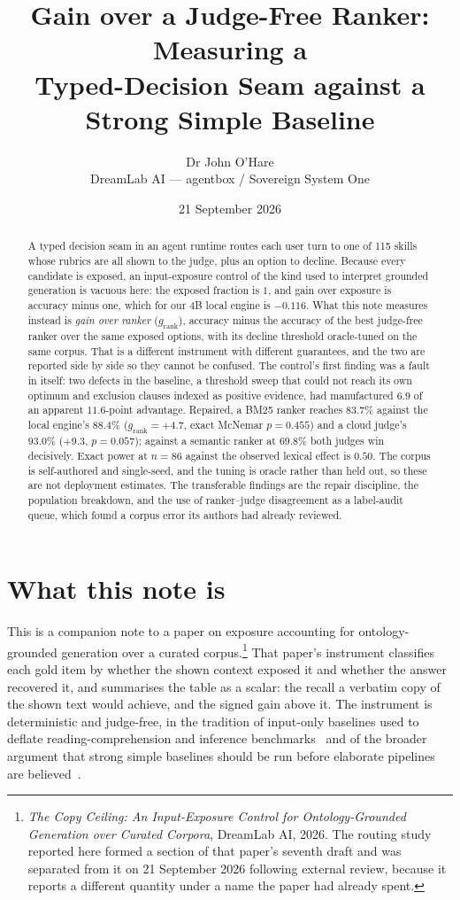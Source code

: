 \documentclass[10pt,twocolumn]{article}
\title{\vspace{-1.2cm}\bfseries Gain over a Judge-Free Ranker: Measuring a\\
Typed-Decision Seam against a Strong Simple Baseline}
\author{Dr John O'Hare\\ \small DreamLab AI --- agentbox / Sovereign System One}
\date{21 September 2026}
\newcommand{\grank}{$g_{\mathrm{rank}}$}
\begin{document}
\maketitle

\begin{abstract}
\noindent
A typed decision seam in an agent runtime routes each user turn to one of 115 skills whose
rubrics are all shown to the judge, plus an option to decline. Because every candidate is
exposed, an input-exposure control of the kind used to interpret grounded generation is
vacuous here: the exposed fraction is $1$, and gain over exposure is accuracy minus one,
which for our 4B local engine is $-0.116$. What this note measures instead is
\emph{gain over ranker} (\grank), accuracy minus the accuracy of the best judge-free
ranker over the same exposed options, with its decline threshold oracle-tuned on the same
corpus. That is a different instrument with different guarantees, and the two are reported
side by side so they cannot be confused. The control's first finding was a fault in itself:
two defects in the baseline, a threshold sweep that could not reach its own optimum and
exclusion clauses indexed as positive evidence, had manufactured $6.9$ of an apparent
$11.6$-point advantage. Repaired, a BM25 ranker reaches $83.7\%$ against the local engine's
$88.4\%$ (\grank${}=+4.7$, exact McNemar $p=0.455$) and a cloud judge's $93.0\%$
(${+}9.3$, $p=0.057$); against a semantic ranker at $69.8\%$ both judges win decisively.
Exact power at $n=86$ against the observed lexical effect is $0.50$. The corpus is self-authored
and single-seed, and the tuning is oracle rather than held out, so these are not deployment
estimates. The transferable findings are the repair discipline, the population breakdown,
and the use of ranker--judge disagreement as a label-audit queue, which found a corpus
error its authors had already reviewed.
\end{abstract}

\section{What this note is}\label{sec:what}
This is a companion note to a paper on exposure accounting for ontology-grounded
generation over a curated corpus.\footnote{\emph{The Copy Ceiling: An Input-Exposure
Control for Ontology-Grounded Generation over Curated Corpora}, DreamLab AI, 2026. The
routing study reported here formed a section of that paper's seventh draft and was
separated from it on 21 September 2026 following external review, because it reports a
different quantity under a name the paper had already spent.} That paper's instrument
classifies each gold item by whether the shown context exposed it and whether the answer
recovered it, and summarises the table as a scalar: the recall a verbatim copy of the shown
text would achieve, and the signed gain above it. The instrument is deterministic and
judge-free, in the tradition of input-only baselines used to deflate reading-comprehension
and inference benchmarks~\cite{kaushik2018reading,gururangan2018artifacts,poliak2018hypothesis,niven2019probing}
and of the broader argument that strong simple baselines should be run before elaborate
pipelines are believed~\cite{laitenberger2025stronger}.
\end{document}
